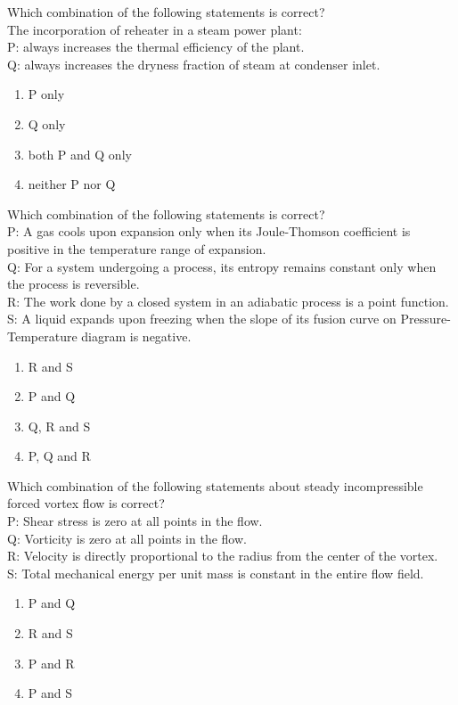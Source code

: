 \bigskip
\item Which combination of the following statements is correct?\\
The incorporation of reheater in a steam power plant:\\
P: always increases the thermal efficiency of the plant.\\
Q: always increases the dryness fraction of steam at condenser inlet.
\begin{enumerate}
    \item P only
    \item Q only
    \item both P and Q only
    \item neither P nor Q
\end{enumerate}
\bigskip
\item Which combination of the following statements is correct?\\
P: A gas cools upon expansion only when its Joule-Thomson coefficient is positive in the temperature range of expansion.\\
 Q: For a system undergoing a process, its entropy remains constant only when the process is reversible.\\
 R: The work done by a closed system in an adiabatic process is a point function.\\
 S: A liquid expands upon freezing when the slope of its fusion curve on Pressure-Temperature diagram is negative.
 \begin{enumerate}
    \item  R and S
    \item  P and Q
    \item  Q, R and S
    \item  P, Q and R
\end{enumerate}
\bigskip
\item Which combination of the following statements about steady incompressible forced vortex flow is correct?\\
P: Shear stress is zero at all points in the flow.\\
Q: Vorticity is zero at all points in the flow.\\
R: Velocity is directly proportional to the radius from the center of the vortex.\\
S: Total mechanical energy per unit mass is constant in the entire flow field.
\begin{enumerate}
    \item P and Q
    \item R and S
    \item P and R
    \item P and S
\end{enumerate}
